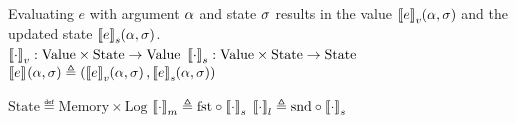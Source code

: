 
Evaluating $e$ with argument $\targ$ and state $\tmem$ results in the value $\denotefv{e}{\targ,\tmem}$ and the updated state $\denotefs{e}{\targ,\tmem}$.\\
$\denotevalue{\cdot} : \mathrm{Value} \times \mathrm{State} \to \mathrm{Value}$\quad\quad
$\denotestate{\cdot} : \mathrm{Value} \times \mathrm{State} \to \mathrm{State}$\quad\quad
$\denotef{e}{\targ,\tmem} \eqdef \left(\denotefv{e}{\targ,\tmem},\denotefs{e}{\targ,\tmem}\right)$

$\mathrm{State} \eqdef \mathrm{Memory} \times \mathrm{Log}$\quad\quad
$\denotesub{m}{\cdot} \triangleq \mathrm{fst} \circ \denotestate{\cdot}$\quad\quad
$\denotesub{l}{\cdot} \triangleq \mathrm{snd} \circ \denotestate{\cdot}$

